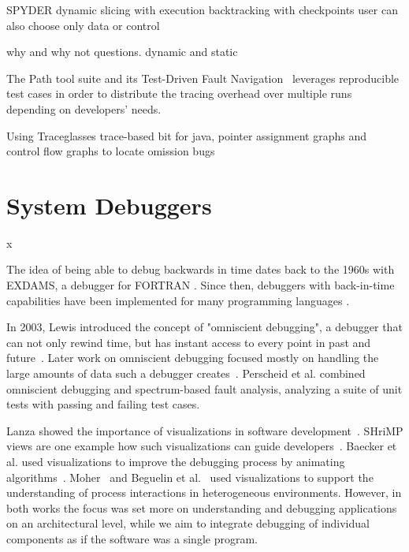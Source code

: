 \cite{agrawal93:debugging_with_dynamic_slicing}
SPYDER
dynamic slicing with execution backtracking with checkpoints
user can also choose only data or control

\cite{ko08:debugging_reinvented_asking}
why and why not questions. dynamic and static

\cite{perscheid13:test-driven_fault_navigation}
The Path tool suite and its Test-Driven Fault Navigation~\cite{perscheid2013} leverages reproducible test cases in order to distribute the tracing overhead over multiple runs depending on developers' needs.



\cite{sakurai15:the_omission_finder}
Using Traceglasses \cite{sakurai10:traceglasses_a_trace-based_debugger} trace-based bit for java,
pointer assignment graphs and control flow graphs to locate omission bugs

\section{System Debuggers}
\label{sec:rw_system_debugging}
x
\newpage


The idea of being able to debug backwards in time dates back to the 1960s with EXDAMS, a debugger for FORTRAN \cite{balzer_exdams_1969}.
Since then, debuggers with back-in-time capabilities have been implemented for many programming languages \cite{agrawal_debugging_1993, feldman_igor_1988, lieberman_zstep_1997}.

In 2003, Lewis introduced the concept of "omniscient debugging", a debugger that can not only rewind time, but has instant access to every point in past and future~\cite{lewis_debugging_2003}.
Later work on omniscient debugging focused mostly on handling the large amounts of data such a debugger creates~\cite{pothier_scalable_2007, lienhard_practical_2008}.
Perscheid et al. \cite{perscheid_testdriven_2013} combined omniscient debugging and spectrum-based fault analysis, analyzing a suite of unit tests with passing and failing test cases.

Lanza showed the importance of visualizations in software development~\cite{lanza2003program}.
SHriMP views are one example how such visualizations can guide developers~\cite{storey2002shrimp}.
Baecker et al. used visualizations to improve the debugging process by animating algorithms~\cite{baecker1997software}.
Moher~\cite{moher1988provide} and Beguelin et al.~\cite{beguelin1993visualization} used visualizations to support the understanding of process interactions in heterogeneous environments.
However, in both works the focus was set more on understanding and debugging applications on an architectural level, while we aim to integrate debugging of individual components as if the software was a single program.

